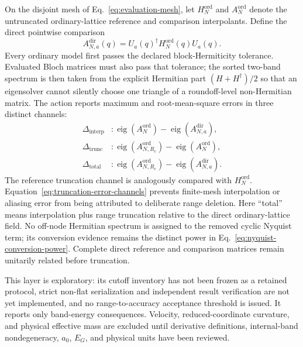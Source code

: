 \documentclass[11pt]{article}
\begin{document}
On the disjoint mesh of Eq.~\eqref{eq:evaluation-mesh}, let
$H_N^{\mathrm{ord}}$ and $A_N^{\mathrm{ord}}$ denote the untruncated ordinary-lattice
reference and comparison interpolants. Define the direct pointwise comparison
\begin{equation}
 A_{N,a}^{\mathrm{dir}}(q)=
 U_a(q)^\dagger H_N^{\mathrm{ord}}(q)U_a(q).
 \label{eq:direct-evaluation-comparison}
\end{equation}
Every ordinary model first passes the declared block-Hermiticity tolerance. Evaluated
Bloch matrices must also pass that tolerance; the sorted two-band spectrum is then taken
from the explicit Hermitian part $(H+H^\dagger)/2$ so that an eigensolver cannot silently
choose one triangle of a roundoff-level non-Hermitian matrix. The action reports maximum
and root-mean-square errors in three distinct channels:
\begin{align}
 \Delta_{\mathrm{interp}} &:
   \operatorname{eig}(A_N^{\mathrm{ord}})-
   \operatorname{eig}(A_{N,a}^{\mathrm{dir}}),\\
 \Delta_{\mathrm{trunc}} &:
   \operatorname{eig}(A_{N,R_c}^{\mathrm{ord}})-
   \operatorname{eig}(A_N^{\mathrm{ord}}),\\
 \Delta_{\mathrm{total}} &:
   \operatorname{eig}(A_{N,R_c}^{\mathrm{ord}})-
   \operatorname{eig}(A_{N,a}^{\mathrm{dir}}).
 \label{eq:truncation-error-channels}
\end{align}
The reference truncation channel is analogously compared with
$H_N^{\mathrm{ord}}$. Equation~\eqref{eq:truncation-error-channels} prevents finite-mesh
interpolation or aliasing error from being attributed to deliberate range deletion.
Here ``total'' means interpolation plus range truncation relative to the direct
ordinary-lattice field. No off-node Hermitian spectrum is assigned to the removed cyclic
Nyquist term; its conversion evidence remains the distinct power in
Eq.~\eqref{eq:nyquist-conversion-power}. Complete direct reference and comparison
matrices remain unitarily related before truncation.

This layer is exploratory: its cutoff inventory has not been frozen as a retained
protocol, strict non-flat serialization and independent result verification are not yet
implemented, and no range-to-accuracy acceptance threshold is issued. It reports only
band-energy consequences. Velocity, reduced-coordinate curvature, and physical
effective mass are excluded until derivative definitions, internal-band nondegeneracy,
$a_0$, $E_G$, and physical units have been reviewed.
\end{document}
